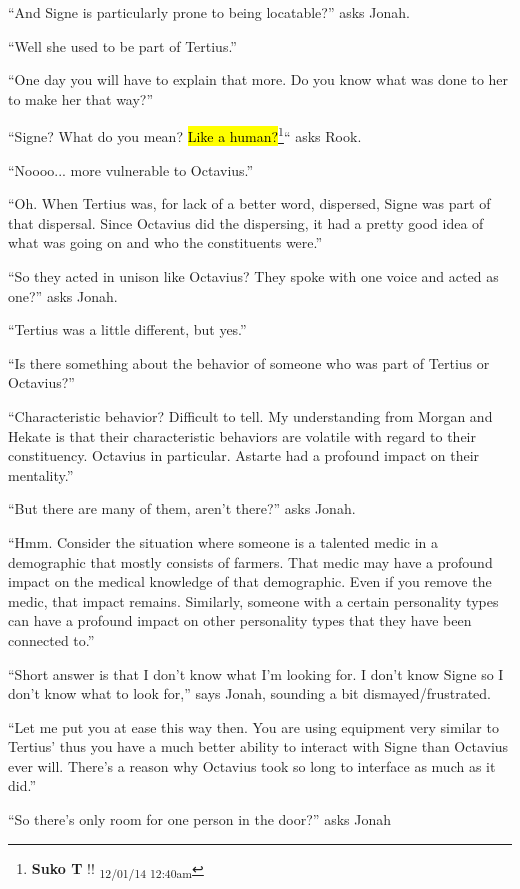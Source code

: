 ``And Signe is particularly prone to being locatable?'' asks Jonah.

``Well she used to be part of Tertius.''

``One day you will have to explain that more.  Do you know what was done to her to make her that way?''

``Signe? What do you mean?  \hl{Like a human?}\footnote{\textbf{Suko T }!! \textsubscript{12/01/14 12:40am}}`` asks Rook.

``Noooo... more vulnerable to Octavius.''

``Oh.  When Tertius was, for lack of a better word, dispersed, Signe was part of that dispersal.  Since Octavius did the dispersing, it had a pretty good idea of what was going on and who the constituents were.''

``So they acted in unison like Octavius?  They spoke with one voice and acted as one?'' asks Jonah.

``Tertius was a little different, but yes.''

``Is there something about the behavior of someone who was part of Tertius or Octavius?''

``Characteristic behavior?   Difficult to tell.  My understanding from Morgan and Hekate is that their characteristic behaviors are volatile with regard to their constituency.  Octavius in particular.  Astarte had a profound impact on their mentality.''

``But there are many of them, aren't there?'' asks Jonah.

``Hmm.  Consider the situation where someone is a talented medic in a demographic that mostly consists of farmers.  That medic may have a profound impact on the medical knowledge of that demographic.  Even if you remove the medic, that impact remains.  Similarly, someone with a certain personality types can have a profound impact on other personality types that they have been connected to.''

``Short answer is that I don't know what I'm looking for.  I don't know Signe so I don't know what to look for,'' says Jonah, sounding a bit dismayed/frustrated.

``Let me put you at ease this way then.  You are using equipment very similar to Tertius' thus you have a much better ability to interact with Signe than Octavius ever will.  There's a reason why Octavius took so long to interface as much as it did.''

``So there's only room for one person in the door?'' asks Jonah

